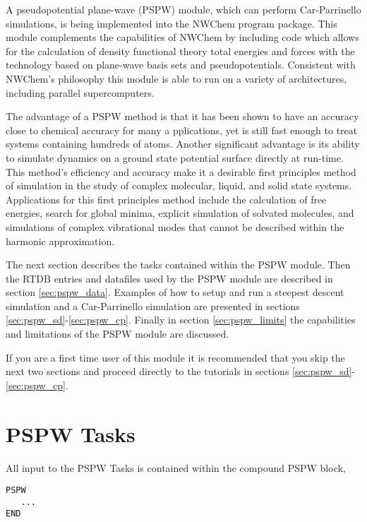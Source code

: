 \label{sec:pspw}

A pseudopotential plane-wave (PSPW) module, which can perform Car-Parrinello
simulations, is being implemented into the NWChem program package.  
This module complements the capabilities of NWChem by including code 
which allows for the calculation of density functional theory total energies 
and forces with the technology based on plane-wave basis sets and 
pseudopotentials.  Consistent with NWChem's philosophy this module is able 
to run on a variety of architectures, including parallel supercomputers.

The advantage of a PSPW method is that it has been shown to have an accuracy 
close to chemical accuracy for many a  pplications, yet is still fast enough 
to treat systems containing hundreds of atoms.  Another significant advantage 
is its ability to simulate dynamics on a ground state potential surface 
directly at run-time.  This method's efficiency and accuracy make it a 
desirable first principles method of simulation in the study of complex 
molecular, liquid, and solid state systems.  Applications for this first 
principles method include the calculation of free energies, search for 
global minima, explicit simulation of solvated molecules, and simulations 
of complex vibrational modes that cannot be described within the harmonic 
approximation.

The next section describes the tasks contained within the PSPW module.
Then the RTDB entries and datafiles used by the PSPW module are described 
in section \ref{sec:pspw_data}.  Examples of how to setup and run
a steepest descent simulation and a Car-Parrinello simulation are presented
in sections \ref{sec:pspw_sd}-\ref{sec:pspw_cp}.  Finally in section
\ref{sec:pspw_limits} the capabilities and limitations of the PSPW
module are discussed.

If you are a first time user of this module it is recommended that you skip
the next two sections and proceed directly to the tutorials in sections 
\ref{sec:pspw_sd}-\ref{sec:pspw_cp}.

\section{PSPW Tasks}
\label{sec:pspw_tasks}

All input to the PSPW Tasks is contained within the compound PSPW  block,
\begin{verbatim}
PSPW
   ...
END
\end{verbatim}

